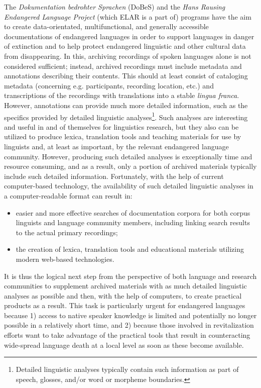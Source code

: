\documentclass[a4paper,12pt]{article}
\begin{document}
The \textit{Dokumentation bedrohter Sprachen} (DoBeS) and the \textit{Hans Rausing Endangered Language Project} (which ELAR is a part of) programs have the aim to create data-orientated, multifunctional, and generally accessible documentations of endangered languages in order to support languages in danger of extinction and to help protect endangered linguistic and other cultural data from disappearing. In this, archiving recordings of spoken languages alone is not considered sufficient; instead, archived recordings must include metadata and annotations describing their contents. This should at least consist of cataloging metadata (concerning e.g. participants, recording location, etc.) and transcriptions of the recordings with translations into a stable \textit{lingua franca}. However, annotations can provide much more detailed information, such as the specifics provided by detailed linguistic analyses\footnote{Detailed linguistic analyses typically contain such information as part of speech, glosses, and/or word or morpheme boundaries.}. Such analyses are interesting and useful in and of themselves for linguistics research, but they also can be utilized to produce lexica, translation tools and teaching materials for use by linguists and, at least as important, by the relevant endangered language community. However, producing such detailed analyses is exceptionally time and resource consuming, and as a result, only a portion of archived materials typically include such detailed information. Fortunately, with the help of current computer-based technology, the availability of such detailed linguistic analyses in a computer-readable format can result in:
\begin{itemize}
\item easier and more effective searches of documentation corpora for both corpus linguists and language community members, including linking search results to the actual primary recordings;
\item the creation of lexica, translation tools and educational materials utilizing modern web-based technologies.
\end{itemize}
It is thus the logical next step from the perspective of both language and research communities to supplement archived materials with as much detailed linguistic analyses as possible and then, with the help of computers, to create practical products as a result. This task is particularly urgent for endangered languages because 1) access to native speaker knowledge is limited and potentially no longer possible in a relatively short time, and 2) because those involved in revitalization efforts want to take advantage of the practical tools that result in counteracting wide-spread language death at a local level as soon as these become available.
\end{document}
